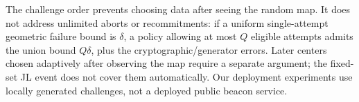The challenge order prevents choosing data after seeing the random map. It does not address unlimited aborts or recommitments: if a uniform single-attempt geometric failure bound is $\delta$, a policy allowing at most $Q$ eligible attempts admits the union bound $Q\delta$, plus the cryptographic/generator errors. Later centers chosen adaptively after observing the map require a separate argument; the fixed-set JL event does not cover them automatically. Our deployment experiments use locally generated challenges, not a deployed public beacon service.
